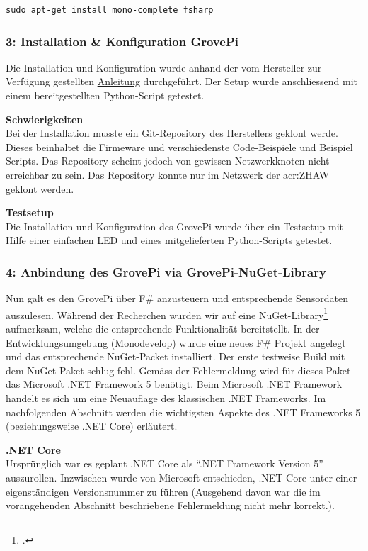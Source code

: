 \begin{lstlisting}
sudo apt-get install mono-complete fsharp
\end{lstlisting}


\subsubsection{3: Installation \& Konfiguration GrovePi}
Die Installation und Konfiguration wurde anhand der vom Hersteller zur Verfügung gestellten \hyperlink{ http://www.dexterindustries.com/GrovePi/get-started-with-the-grovepi/setting-software/}{Anleitung} durchgeführt. Der Setup wurde anschliessend mit einem bereitgestellten Python-Script getestet.

\textbf{Schwierigkeiten}\\
Bei der Installation musste ein Git-Repository des Herstellers geklont werde. Dieses beinhaltet die Firmeware und verschiedenste Code-Beispiele und Beispiel Scripts. Das Repository scheint jedoch von gewissen Netzwerkknoten nicht erreichbar zu sein. Das Repository konnte nur im Netzwerk der \gls{acr:ZHAW} geklont werden.

\textbf{Testsetup}\\
Die Installation und Konfiguration des GrovePi wurde über ein Testsetup mit Hilfe einer einfachen LED und eines mitgelieferten Python-Scripts getestet.


\subsubsection{4: Anbindung des GrovePi via GrovePi-NuGet-Library}
Nun galt es den GrovePi über F\# anzusteuern und entsprechende Sensordaten auszulesen. Während der Recherchen wurden wir auf eine NuGet-Library\footcite{NuGet_GrovePi_2016-04-24} aufmerksam, welche die entsprechende Funktionalität bereitstellt. In der Entwicklungsumgebung (Monodevelop) wurde eine neues F\# Projekt angelegt und das entsprechende NuGet-Packet installiert. Der erste testweise Build mit dem NuGet-Paket schlug fehl. Gemäss der Fehlermeldung wird für dieses Paket das Microsoft .NET Framework 5 benötigt. Beim Microsoft .NET Framework handelt es sich um eine Neuauflage des klassischen .NET Frameworks. Im nachfolgenden Abschnitt werden die wichtigsten Aspekte des .NET Frameworks 5 (beziehungsweise .NET Core) erläutert.

\textbf{.NET Core}\\
Ursprünglich war es geplant .NET Core als "`.NET Framework Version 5"' auszurollen. Inzwischen wurde von Microsoft entschieden, .NET Core unter einer eigenständigen Versionsnummer zu führen (Ausgehend davon war die im vorangehenden Abschnitt beschriebene Fehlermeldung nicht mehr korrekt.).

